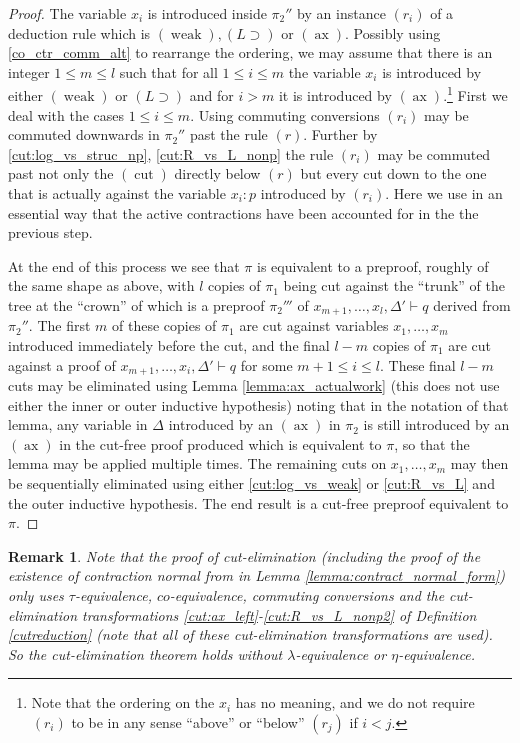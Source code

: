 \documentclass[english,letter paper,12pt,leqno]{article}
\theoremstyle{example}
\newtheorem{remark}[theorem]{Remark}
\numberwithin{equation}{section}
\def\imp{\supset}
\begin{document}
\begin{proof}
The variable $x_i$ is introduced inside $\pi_2''$ by an instance $(r_i)$ of a deduction rule which is $(\operatorname{weak}), (L \imp)$ or $(\operatorname{ax})$. Possibly using \eqref{co_ctr_comm_alt} to rearrange the ordering, we may assume that there is an integer $1 \le m \le l$ such that for all $1 \le i \le m$ the variable $x_i$ is introduced by either $(\operatorname{weak})$ or $(L \imp)$ and for $i > m$ it is introduced by $(\operatorname{ax})$.\footnote{Note that the ordering on the $x_i$ has no meaning, and we do not require $(r_i)$ to be in any sense ``above'' or ``below'' $(r_j)$ if $i < j$.} First we deal with the cases $1 \le i \le m$. Using commuting conversions $(r_i)$ may be commuted downwards in $\pi_2''$ past the rule $(r)$. Further by \eqref{cut:log_vs_struc_np}, \eqref{cut:R_vs_L_nonp} the rule $(r_i)$ may be commuted past not only the $(\operatorname{cut})$ directly below $(r)$ but every cut down to the one that is actually against the variable $x_i:p$ introduced by $(r_i)$. Here we use in an essential way that the active contractions have been accounted for in the the previous step.

At the end of this process we see that $\pi$ is equivalent to a preproof, roughly of the same shape as above, with $l$ copies of $\pi_1$ being cut against the ``trunk'' of the tree at the ``crown'' of which is a preproof $\pi_2'''$ of $x_{m+1},\ldots,x_l, \Delta' \vdash q$ derived from $\pi_2''$. The first $m$ of these copies of $\pi_1$ are cut against variables $x_1,\ldots,x_m$ introduced immediately before the cut, and the final $l-m$ copies of $\pi_1$ are cut against a proof of $x_{m+1},\ldots,x_i,\Delta' \vdash q$ for some $m+1 \le i \le l$. These final $l-m$ cuts may be eliminated using Lemma \ref{lemma:ax_actualwork} (this does not use either the inner or outer inductive hypothesis) noting that in the notation of that lemma, any variable in $\Delta$ introduced by an $(\operatorname{ax})$ in $\pi_2$ is still introduced by an $(\operatorname{ax})$ in the cut-free proof produced which is equivalent to $\pi$, so that the lemma may be applied multiple times. The remaining cuts on $x_1,\ldots,x_m$ may then be sequentially eliminated using either \eqref{cut:log_vs_weak} or \eqref{cut:R_vs_L} and the outer inductive hypothesis. The end result is a cut-free preproof equivalent to $\pi$.
\end{proof}

\begin{remark} Note that the proof of cut-elimination (including the proof of the existence of contraction normal from in Lemma \ref{lemma:contract_normal_form}) only uses $\tau$-equivalence, $co$-equivalence, commuting conversions and the cut-elimination transformations \eqref{cut:ax_left}-\eqref{cut:R_vs_L_nonp2} of Definition \ref{cutreduction} (note that all of these cut-elimination transformations are used). So the cut-elimination theorem holds without $\lambda$-equivalence or $\eta$-equivalence.
\end{remark}
\end{document}
